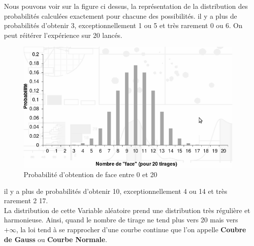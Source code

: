 Nous pouvons voir sur la figure ci dessus, la représentation de la distribution des probabilités calculées exactement pour chacune des possibilités.\newline
il y a plus de probabilités d'obtenir 3, exceptionnellement 1 ou 5 et très rarement 0 ou 6.\newline
On peut réitérer l'expérience sur 20 lancés.
\begin{figure}[H]\begin{center}\includegraphics[scale=0.5]{ilu/g2.png}\caption{Probabilité d'obtention de face entre 0 et 20}\end{center}\end{figure}
il y a plus de probabilités d'obtenir 10, exceptionnellement 4 ou 14 et très rarement 2 17.\newline
\\
La distribution de cette Variable aléatoire prend une distribution très régulière et harmonieuse.\newline
Ainsi, quand le nombre de tirage ne tend plus vers 20 mais vers $+\infty$, la loi tend à se rapprocher d'une courbe continue que l'on appelle \textbf{Coubre de Gauss} ou \textbf{Courbe Normale}.

